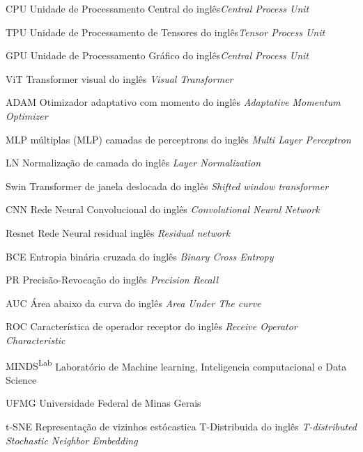 \begin{siglas}
\item[CPU] Unidade de Processamento Central do inglês\textit{Central Process Unit}
\item[TPU] Unidade de Processamento de Tensores do inglês\textit{Tensor Process Unit}
\item[GPU] Unidade de Processamento Gráfico do inglês\textit{Central Process Unit}

\item[ViT] Transformer visual do inglês \textit{Visual Transformer}
\item[ADAM] Otimizador adaptativo com momento do inglês \textit{Adaptative Momentum Optimizer}
\item[MLP]  múltiplas (MLP) camadas de perceptrons do inglês \textit{Multi Layer Perceptron}
\item[LN] Normalização de camada do inglês \textit{Layer Normalization}
\item[Swin] Transformer de janela deslocada do inglês \textit{Shifted window transformer}
\item[CNN] Rede Neural Convolucional do inglês \textit{Convolutional Neural Network}
\item[Resnet] Rede Neural residual inglês \textit{Residual network}
\item[BCE] Entropia binária cruzada do inglês \textit{Binary Cross Entropy}
\item[PR] Precisão-Revocação do inglês \textit{Precision Recall}  
\item[AUC] Área abaixo da curva do inglês \textit{Area Under The curve}
\item[ROC] Característica de operador receptor do inglês \textit{Receive Operator Characteristic}  
\item[MINDS\textsuperscript{Lab}] Laboratório de Machine learning, Inteligencia computacional e Data Science
\item[UFMG] Universidade Federal de Minas Gerais
\item[t-SNE] Representação de vizinhos estócastica T-Distribuida do inglês \textit{T-distributed Stochastic Neighbor Embedding}

\end{siglas}
